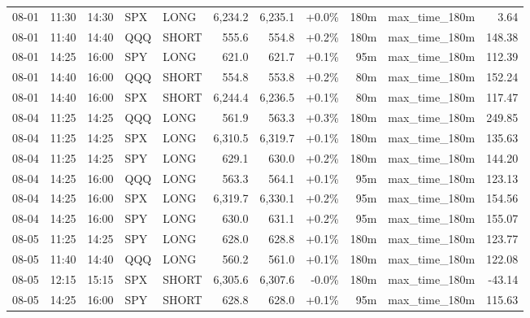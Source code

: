 \documentclass[11pt,a4paper,twoside]{article}
\begin{document}
\begin{center}
\begin{longtable}{>{\color{txtmain}}l l l l l r r r r >{\color{txtmain}}l r}
08-01 & 11:30 & 14:30 & SPX & LONG & 6,234.2 & 6,235.1 & \textcolor{wingreen}{+0.0\%} & 180m & max\_time\_180m & \textcolor{wingreen}{3.64} \\
08-01 & 11:40 & 14:40 & QQQ & SHORT & 555.6 & 554.8 & \textcolor{wingreen}{+0.2\%} & 180m & max\_time\_180m & \textcolor{wingreen}{148.38} \\
08-01 & 14:25 & 16:00 & SPY & LONG & 621.0 & 621.7 & \textcolor{wingreen}{+0.1\%} & 95m & max\_time\_180m & \textcolor{wingreen}{112.39} \\
08-01 & 14:40 & 16:00 & QQQ & SHORT & 554.8 & 553.8 & \textcolor{wingreen}{+0.2\%} & 80m & max\_time\_180m & \textcolor{wingreen}{152.24} \\
08-01 & 14:40 & 16:00 & SPX & SHORT & 6,244.4 & 6,236.5 & \textcolor{wingreen}{+0.1\%} & 80m & max\_time\_180m & \textcolor{wingreen}{117.47} \\
08-04 & 11:25 & 14:25 & QQQ & LONG & 561.9 & 563.3 & \textcolor{wingreen}{+0.3\%} & 180m & max\_time\_180m & \textcolor{wingreen}{249.85} \\
08-04 & 11:25 & 14:25 & SPX & LONG & 6,310.5 & 6,319.7 & \textcolor{wingreen}{+0.1\%} & 180m & max\_time\_180m & \textcolor{wingreen}{135.63} \\
08-04 & 11:25 & 14:25 & SPY & LONG & 629.1 & 630.0 & \textcolor{wingreen}{+0.2\%} & 180m & max\_time\_180m & \textcolor{wingreen}{144.20} \\
08-04 & 14:25 & 16:00 & QQQ & LONG & 563.3 & 564.1 & \textcolor{wingreen}{+0.1\%} & 95m & max\_time\_180m & \textcolor{wingreen}{123.13} \\
08-04 & 14:25 & 16:00 & SPX & LONG & 6,319.7 & 6,330.1 & \textcolor{wingreen}{+0.2\%} & 95m & max\_time\_180m & \textcolor{wingreen}{154.56} \\
08-04 & 14:25 & 16:00 & SPY & LONG & 630.0 & 631.1 & \textcolor{wingreen}{+0.2\%} & 95m & max\_time\_180m & \textcolor{wingreen}{155.07} \\
08-05 & 11:25 & 14:25 & SPY & LONG & 628.0 & 628.8 & \textcolor{wingreen}{+0.1\%} & 180m & max\_time\_180m & \textcolor{wingreen}{123.77} \\
08-05 & 11:40 & 14:40 & QQQ & LONG & 560.2 & 561.0 & \textcolor{wingreen}{+0.1\%} & 180m & max\_time\_180m & \textcolor{wingreen}{122.08} \\
08-05 & 12:15 & 15:15 & SPX & SHORT & 6,305.6 & 6,307.6 & \textcolor{lossred}{-0.0\%} & 180m & max\_time\_180m & \textcolor{lossred}{-43.14} \\
08-05 & 14:25 & 16:00 & SPY & SHORT & 628.8 & 628.0 & \textcolor{wingreen}{+0.1\%} & 95m & max\_time\_180m & \textcolor{wingreen}{115.63} \\

\end{longtable}
\end{center}
\end{document}
